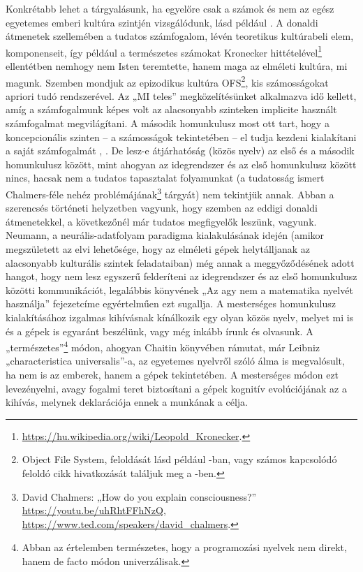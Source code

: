 \documentclass[a4paper]{article}
\begin{document}
Konkrétabb lehet a tárgyalásunk, ha egyelőre csak a számok és nem az egész egyetemes emberi kultúra szintjén vizsgálódunk, lásd például \cite{SMNIST}. A donaldi átmenetek szellemében a tudatos számfogalom, lévén teoretikus kultúrabeli elem, komponenseit, így például a természetes számokat Kronecker hittételével\footnote{\url{https://hu.wikipedia.org/wiki/Leopold_Kronecker}.} ellentétben nemhogy nem Isten teremtette, hanem maga az elméleti kultúra, mi magunk. Szemben mondjuk az epizodikus kultúra OFS\footnote{Object File System, feloldását lásd például \cite{OFS}-ban, vagy számos kapcsolódó feloldó cikk hivatkozását találjuk meg a \cite{SMNIST}-ben.}, kis számosságokat apriori tudó rendszerével. Az „MI teles” megközelítésünket alkalmazva idő kellett, amíg a számfogalmunk képes volt az alacsonyabb szinteken implicite használt számfogalmat megvilágítani. A második homunkulusz most ott tart, hogy a koncepcionális szinten – a számosságok tekintetében – el tudja kezdeni kialakítani a saját számfogalmát \cite{DCNNNUM}, \cite{SMNIST}. De lesz-e átjárhatóság (közös nyelv) az első és a második homunkulusz között, mint ahogyan az idegrendszer és az első homunkulusz között nincs, hacsak nem a tudatos tapasztalat folyamunkat (a tudatosság ismert Chalmers-féle nehéz problémájának\footnote{David Chalmers: „How do you explain consciousness?” \url{https://youtu.be/uhRhtFFhNzQ}, \url{https://www.ted.com/speakers/david_chalmers}.} tárgyát) nem tekintjük annak. Abban a szerencsés történeti helyzetben vagyunk, hogy szemben az eddigi donaldi átmenetekkel, a következőnél már tudatos megfigyelők leszünk, vagyunk. Neumann, a neurális-adatfolyam paradigma kialakulásának idején (amikor megszületett az elvi lehetősége, hogy az elméleti gépek helytálljanak az alacsonyabb kulturális szintek feladataiban) még annak a meggyőződésének adott hangot, hogy nem lesz egyszerű felderíteni az idegrendszer és az első homunkulusz közötti kommunikációt, legalábbis \cite{Neumann72} könyvének „Az agy nem a matematika nyelvét használja” fejezetcíme egyértelműen ezt sugallja. A mesterséges homunkulusz kialakításához izgalmas kihívásnak kínálkozik egy olyan közös nyelv, melyet mi is és a gépek is egyaránt beszélünk, vagy még inkább írunk és olvasunk. A „természetes”\footnote{Abban az értelemben természetes, hogy a programozási nyelvek nem direkt, hanem de facto módon univerzálisak.} módon, ahogyan Chaitin \cite[38]{Omega} könyvében rámutat, már Leibniz „characteristica universalis”-a, az egyetemes nyelvről szóló álma is megvalósult, ha nem is az emberek, hanem a gépek tekintetében. A mesterséges módon ezt levezényelni, avagy fogalmi teret biztosítani a gépek kognitív evolúciójának az a kihívás, melynek deklarációja ennek a munkának a célja.
\end{document}
